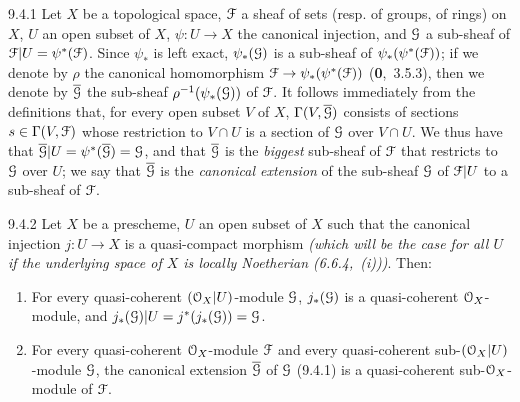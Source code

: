 \documentclass[../main.tex]{subfiles}
\begin{document}
\begin{cx}{9.4.1}
    Let $X$ be a topological space, $\mathcal{F}$ a sheaf of sets (resp. of groups, of rings) on $X$, $U$ an open subset of $X$, $\psi\colon U\to X$ the canonical injection, and $\mathcal{G}$ a sub-sheaf of $\mathcal{F}|U=\psi^*(\mathcal{F})$.
    Since $\psi_*$ is left exact, $\psi_*(\mathcal{G})$ is a sub-sheaf of $\psi_*(\psi^*(\mathcal{F}))$; if we denote by $\rho$ the canonical homomorphism $\mathcal{F}\to\psi_*(\psi^*(\mathcal{F}))$ (\textbf{0},~3.5.3), then we denote by $\overline{\mathcal{G}}$ the sub-sheaf $\rho^{-1}(\psi_*(\mathcal{G}))$ of $\mathcal{F}$.
    It follows immediately from the definitions that, for every open subset $V$ of $X$, $\Gamma(V,\overline{\mathcal{G}})$ consists of sections $s\in\Gamma(V,\mathcal{F})$ whose restriction to $V\cap U$ is a section of $\mathcal{G}$ over $V\cap U$.
    We thus have that $\overline{\mathcal{G}}|U=\psi^*(\overline{\mathcal{G}})=\mathcal{G}$, and that $\overline{\mathcal{G}}$ is the \emph{biggest} sub-sheaf of $\mathcal{F}$ that restricts to $\mathcal{G}$ over $U$; we say that $\overline{\mathcal{G}}$ is the \emph{canonical extension} of the sub-sheaf $\mathcal{G}$ of $\mathcal{F}|U$ to a sub-sheaf of $\mathcal{F}$.
\end{cx}

\begin{cx}[Proposition]{9.4.2}
    Let $X$ be a prescheme, $U$ an open subset of $X$ such that the canonical injection $j\colon U\to X$ is a quasi-compact morphism \emph{(which will be the case for \emph{all} $U$ if the underlying space of $X$ is \emph{locally Noetherian} {\normalfont(6.6.4,~(i))})}.
    Then:
    \begin{enumerate}[label=\normalfont(\roman*)]
        \item For every quasi-coherent $(\mathcal{O}_X|U)$-module $\mathcal{G}$, $j_*(\mathcal{G})$ is a quasi-coherent $\mathcal{O}_X$-module, and $j_*(\mathcal{G})|U=j^*(j_*(\mathcal{G}))=\mathcal{G}$.
        \item For every quasi-coherent $\mathcal{O}_X$-module $\mathcal{F}$ and every quasi-coherent sub-$(\mathcal{O}_X|U)$-module $\mathcal{G}$, the canonical extension $\overline{\mathcal{G}}$ of $\mathcal{G}$ {\normalfont(9.4.1)} is a quasi-coherent sub-$\mathcal{O}_X$-module of $\mathcal{F}$.
    \end{enumerate}
\end{cx}
\end{document}
